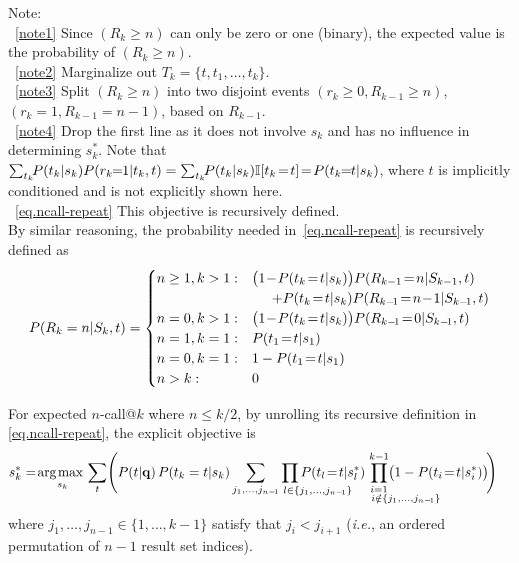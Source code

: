\noindent
Note: \\
~\eqref{note1} Since $( R_k \geq n )$ can only be zero or one (binary), the expected value is the probability of $( R_k \geq n )$. \\
~\eqref{note2} Marginalize out $T_k\!=\!\{t,t_1,\dots,t_k\}$. \\
~\eqref{note3} Split $( R_k \geq n )$ into two disjoint events $(r_k \! \geq \! 0, R_{k\!-\!1}\!\geq \!n)$, $(r_k\!=\!1, R_{k\!-\!1}\!=\!n\!-\!1)$, based on $R_{k-1}$. \\
~\eqref{note4} Drop the first line as it does not involve $s_k$ and has no influence in determining $s_k^*$. Note that $\sum_{t_k} \!\! P(t_k|s_k) P(r_k\!\!=\!\!1|t_k,t) = \sum_{t_k} \!\! P(t_k|s_k) \I[t_k\!=\!t] \! = \! P(t_k\!\!=\!\!t|s_k)$, where $t$ is implicitly conditioned and is not explicitly shown here. \\
~\eqref{eq.ncall-repeat} This objective is recursively defined. \\

By similar reasoning, the probability needed in~\eqref{eq.ncall-repeat} is recursively defined as
\begin{align*}
P(R_k=n|S_k,t)=
\begin{cases}
n \geq 1, k > 1:  &  \bigl( 1\!-\!P(t_k\!=\!t|s_k) \bigr) P(R_{k-1}\!=\!n|S_{k-1},t) \nonumber \\
  & \hspace{5mm} + P(t_k\!=\!t|s_k) P(R_{k-\!1}\!=\!n\!-\!1|S_{k-\!1},t) \\
n = 0, k > 1:   & \bigl( 1\!-\!P(t_k\!=\!t|s_k) \bigr) P(R_{k-\!1}\!=\!0|S_{k-\!1},t) \\
n = 1, k = 1:   & P(t_1\!=\!t|s_1) \\
n = 0, k = 1:   & 1 - P(t_1\!=\!t|s_1) \\
n > k:			& 0
\end{cases}
\end{align*}

For expected $n$-call@$k$ where $n \! \leq \! k/2$, by unrolling its recursive definition in \eqref{eq.ncall-repeat}, the explicit objective is
\begin{align}
  & s_k^* = \argmax_{s_k} \sum_t \Biggl( P(t|\vec{q}) \, P(t_k=t|s_k) \sum_{j_1, \dots, j_{n-\!1}} \hspace{-14mm} \prod_{\hspace{14.5mm} l \in \{j_1, \dots, j_{n-\!1}\}} \hspace{-14mm} P(t_l\!=\!t|s_l^*) \hspace{-13mm} \prod_{\substack{i=1 \\ \hspace{14mm} i \notin \{j_1, \dots, j_{n-\!1}\}}}^{k-1} \hspace{-13mm} \!\bigl( 1 - P(t_i\!=\!t|s_i^*) \bigr) \!\Biggr) \label{eq.ncall.alt-repeat}
\end{align}
where $j_1, \dots, j_{n-1} \in \{1,\ldots,k-1\}$ satisfy 
that $j_i < j_{i+1}$ (\emph{i.e.},
an ordered permutation of $n-1$ result set indices). \\


